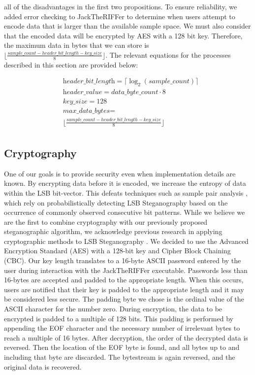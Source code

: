 all of the disadvantages in the first two propositions. To ensure reliability, we added error checking to JackTheRIFFer to determine when users attempt to encode data that is larger than the available sample space. We must also consider that the encoded data will be encrypted by AES with a 128 bit key. Therefore, the maximum data in bytes that we can store is $\lfloor\frac{sample\_count - header\_bit\_length - key\_size}{8}\rfloor$. The relevant equations for the processes described in this section are provided below:

\begin{align*}
&\textit{header\_bit\_length} = 
\lceil\log_2(\textit{sample\_count})\rceil \\
&\textit{header\_value} = data\_byte\_count \cdot 8 \\
&\textit{key\_size} = 128 \\
&\textit{max\_data\_bytes} = \\
&\lfloor\frac{sample\_count - header\_bit\_length - key\_size}{8}\rfloor \\
\end{align*}

\subsection{Cryptography}
One of our goals is to provide security even when implementation details are known.
By encrypting data before it is encoded, we increase the entropy of data within the LSB bit-vector. This defeats techniques such as sample pair analysis \cite{paper2}, which rely on probabilistically detecting LSB Steganography based on the occurrence of commonly observed consecutive bit patterns. While we believe we are the first to combine cryptography with our previously proposed steganographic algorithm, we acknowledge previous research in applying cryptographic methods to LSB Steganography \cite{paper8}. We decided to use the Advanced Encryption Standard (AES) with a 128-bit key and Cipher Block Chaining (CBC). Our key length translates to a 16-byte ASCII password entered by the user during interaction with the JackTheRIFFer executable. Passwords less than 16-bytes are accepted and padded to the appropriate length. When this occurs, users are notified that their key is padded to the appropriate length and it may be considered less secure. The padding byte we chose is the ordinal value of the ASCII character for the number zero. During encryption, the data to be encrypted is padded to a multiple of 128 bits. This padding is performed by appending the EOF character and the necessary number of irrelevant bytes to reach a multiple of 16 bytes. After decryption, the order of the decrypted data is reversed. Then the location of the EOF byte is found, and all bytes up to and including that byte are discarded. The bytestream is again reversed, and the original data is recovered.


